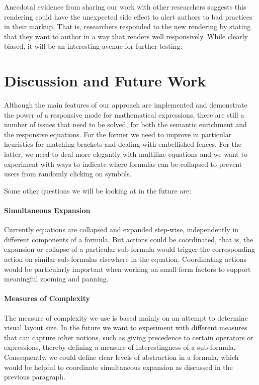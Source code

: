 \documentclass{llncs}
\begin{document}
Anecdotal evidence from sharing our work with other researchers suggests this 
rendering could have the unexpected side effect to alert authors to bad 
practices in their markup. That is, researchers responded to the new rendering 
by stating that they want to author in a way  that renders well responsively. 
While clearly biased, it will be an interesting avenue for further testing.

\section{Discussion and Future Work}
\label{sec:discussion}

Although the main features of our approach are implemented and demonstrate the
power of a responsive mode for mathematical expressions, there are still a
number of issues that need to be solved, for both the semantic enrichment and
the responsive equations. For the former we need to improve in particular
heuristics for matching brackets and dealing with embellished fences. For the
latter, we need to deal more elegantly with multiline equations and we want to
experiment with ways to indicate where formulas can be collapsed to prevent
users from randomly clicking on symbols.

Some other questions we will be looking at in the future are:

\paragraph{Simultaneous Expansion}

Currently equations are collapsed and expanded step-wise, independently in
different components of a formula. But actions could be coordinated, that is,
the expansion or collapse of a particular sub-formula would trigger the
corresponding action on similar sub-formulas elsewhere in the equation.
Coordinating actions would be particularly important when working on small form
factors to support meaningful zooming and panning.

\paragraph{Measures of Complexity}

The measure of complexity we use is based mainly on an attempt to determine
visual layout size. In the future we want to experiment with different measures
that can capture other notions, such as giving precedence to certain operators
or expressions, thereby defining a measure of interestingness of a sub-formula.
Consequently, we could define clear levels of abstraction in a formula, which
would be helpful to coordinate simultaneous expansion as discussed in the
previous paragraph.
\end{document}

